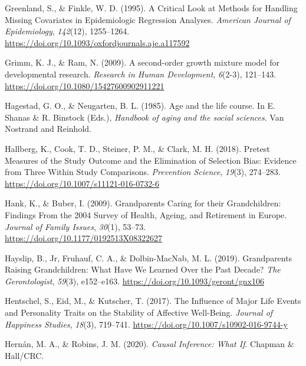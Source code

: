 \documentclass[
  english,
  man, noextraspace]{apa7}
\begin{document}
\leavevmode\hypertarget{ref-greenlandCriticalLookMethods1995}{}%
Greenland, S., \& Finkle, W. D. (1995). A Critical Look at Methods for Handling Missing Covariates in Epidemiologic Regression Analyses. \emph{American Journal of Epidemiology}, \emph{142}(12), 1255--1264. \url{https://doi.org/10.1093/oxfordjournals.aje.a117592}

\leavevmode\hypertarget{ref-grimmSecondorderGrowthMixture2009}{}%
Grimm, K. J., \& Ram, N. (2009). A second-order growth mixture model for developmental research. \emph{Research in Human Development}, \emph{6}(2-3), 121--143. \url{https://doi.org/10.1080/15427600902911221}

\leavevmode\hypertarget{ref-hagestadAgeLifeCourse1985}{}%
Hagestad, G. O., \& Neugarten, B. L. (1985). Age and the life course. In E. Shanas \& R. Binstock (Eds.), \emph{Handbook of aging and the social sciences}. Van Nostrand and Reinhold.

\leavevmode\hypertarget{ref-hallbergPretestMeasuresStudy2018}{}%
Hallberg, K., Cook, T. D., Steiner, P. M., \& Clark, M. H. (2018). Pretest Measures of the Study Outcome and the Elimination of Selection Bias: Evidence from Three Within Study Comparisons. \emph{Prevention Science}, \emph{19}(3), 274--283. \url{https://doi.org/10.1007/s11121-016-0732-6}

\leavevmode\hypertarget{ref-hankGrandparentsCaringTheir2009}{}%
Hank, K., \& Buber, I. (2009). Grandparents Caring for their Grandchildren: Findings From the 2004 Survey of Health, Ageing, and Retirement in Europe. \emph{Journal of Family Issues}, \emph{30}(1), 53--73. \url{https://doi.org/10.1177/0192513X08322627}

\leavevmode\hypertarget{ref-hayslipGrandparentsRaisingGrandchildren2019}{}%
Hayslip, B., Jr, Fruhauf, C. A., \& Dolbin-MacNab, M. L. (2019). Grandparents Raising Grandchildren: What Have We Learned Over the Past Decade? \emph{The Gerontologist}, \emph{59}(3), e152--e163. \url{https://doi.org/10.1093/geront/gnx106}

\leavevmode\hypertarget{ref-hentschelInfluenceMajorLife2017}{}%
Hentschel, S., Eid, M., \& Kutscher, T. (2017). The Influence of Major Life Events and Personality Traits on the Stability of Affective Well-Being. \emph{Journal of Happiness Studies}, \emph{18}(3), 719--741. \url{https://doi.org/10.1007/s10902-016-9744-y}

\leavevmode\hypertarget{ref-hernanCausalInferenceWhat2020}{}%
Hernán, M. A., \& Robins, J. M. (2020). \emph{Causal Inference: What If}. Chapman \& Hall/CRC.
\end{document}
